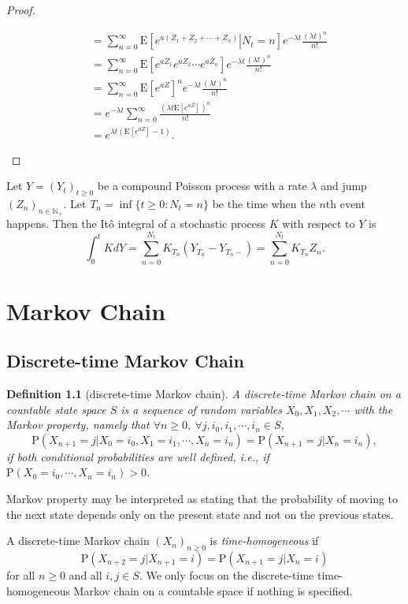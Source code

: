 \documentclass{report}
\newtheorem{definition}{Definition}[section]
\theoremstyle{nonumberplain}
\newtheorem{proof}{Proof.}
\begin{document}
\begin{proof}
\begin{enumerate}
\[\begin{aligned}
	&=\sum_{n=0}^{\infty}\mathrm{E}\left[\left.e^{a\left(Z_1+Z_2+\cdots+Z_{n}\right)}\right|N_t=n\right]e^{-\lambda t}\frac{\left(\lambda t\right)^n}{n!}\\
	&=\sum_{n=0}^{\infty}\mathrm{E}\left[e^{aZ_1}e^{aZ_2}\cdots e^{aZ_{n}}\right]e^{-\lambda t}\frac{\left(\lambda t\right)^n}{n!}\\
	&=\sum_{n=0}^{\infty}\mathrm{E}\left[e^{aZ}\right]^ne^{-\lambda t}\frac{\left(\lambda t\right)^n}{n!}\\
	&=e^{-\lambda t}\sum_{n=0}^{\infty}\frac{\left(\lambda t\mathrm{E}\left[e^{aZ}\right]\right)^n}{n!}\\
	&=e^{\lambda t\left(\mathrm{E}\left[e^{aZ}\right]-1\right)}.
 	\end{aligned}
 	\]
\end{enumerate}
\end{proof}
Let $Y=(Y_t)_{t\ge 0}$ be a compound Poisson process with a rate $\lambda$ and jump $(Z_n)_{n\in \mathbb{N}_+}$. Let $T_n=\inf\{t\ge0:N_t= n\}$ be the time when the $n$th event happens. Then the Itô integral of a stochastic process $K$ with respect to $Y$ is
\[
\int_{0}^{t}KdY=\sum_{n=0}^{N_t}K_{T_n}(Y_{T_n}-Y_{T_n-})=\sum_{n=0}^{N_t}K_{T_n}Z_n.
\]


\chapter{Markov Chain}
\section{Discrete-time Markov Chain}
\begin{definition}[discrete-time Markov chain]
	A \emph{discrete-time Markov chain} on a countable state space $S$ is a sequence of random variables $X_0, X_1, X_2,\cdots$ with the Markov property, namely that $\forall n\ge0,\ \forall j,i_0,i_1,\cdots,i_n\in S$,	
	\[
	\mathrm{P}(X_{n+1}=j| X_{0}=i_{0},X_{1}=i_{1},\cdots,X_{n}=i_{n})=\mathrm{P}(X_{n+1}=j| X_{n}=i_{n}), 
	\] if both conditional probabilities are well defined, i.e., if $ 	\mathrm{P}(X_{0}=i_{0},\cdots ,X_{n}=i_{n})>0$.
\end{definition}	
Markov property may be interpreted as stating that the probability of moving to the next state depends only on the present state and not on the previous states. 

\noindent A discrete-time Markov chain $(X_n)_{n\ge0}$ is \emph{time-homogeneous} if
\[
\mathrm{P}(X_{n+2}=j| X_{n+1}=i)=\mathrm{P}(X_{n+1}=j| X_{n}=i)
\]
for all $n\ge0$ and all $i,j\in S$. We only focus on the discrete-time time-homogeneous Markov chain on a countable space if nothing is specified. 
\end{document}
